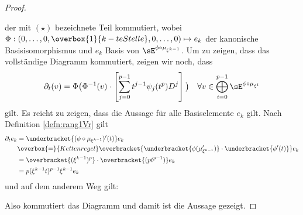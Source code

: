 \begin{proof}
\begin{center}
\end{center}
der mit $(\star)$ bezeichnete Teil kommutiert,
wobei $\Phi:(0,\dots,0,\overbox{1}{k-te Stelle},0,\dots,0)\mapsto e_k$ der
kanonische Basisisomorphismus und $e_k$ Basis von
$\sE^{\phi\circ\mu_{\xi^{k-1}}}$.
Um zu zeigen, dass das vollständige Diagramm kommutiert, zeigen wir noch, dass
\begin{align*}
\partial_t(v) =\Phi\big(\Phi^{-1}(v)
  \cdot\left[\sum_{j=0}^{p-1}t^{j-1}\psi_j(t^p)D^j\right]\big)
& & \forall v\in \bigoplus_{i=0}^{p-1}\sE^{\phi\circ\mu_{\xi^i}} \\
\end{align*}
gilt. Es reicht zu zeigen, dass die Aussage für alle Basiselemente $e_k$ gilt.
Nach Definition \ref{defn:rang1Vr} gilt
\begin{align*}
\partial_t e_k &= \underbracket{(\phi\circ\mu_{\xi^{k-1}})'(t)}e_k
\\&\overbox{=}{Kettenregel}
  \overbracket{\underbracket{\phi(\mu_{\xi^{k-1}}')}
  \cdot\underbracket{\phi'(t)}}e_k
\\&=\overbracket{(\xi^{k-1})^p}\cdot\overbracket{(pt^{p-1})}e_k
\\&=p(\xi^{k-1}t)^{p-1}\xi^{k-1}e_k
\end{align*}
und auf dem anderem Weg gilt:
\begin{center}
\end{center}
Also kommutiert das Diagramm und damit ist die Aussage gezeigt.
\end{proof}
